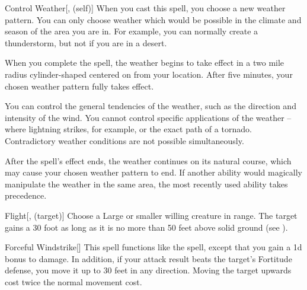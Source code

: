 \lowercase{\hypertarget{spell:Control Weather}{}}\label{spell:Control Weather}
\begin{attuneability}[\nth{4}]{\hypertarget{spell:Control Weather}{Control Weather}}[,  (self)]
When you cast this spell, you choose a new weather pattern.
You can only choose weather which would be possible in the climate and season of the area you are in.
For example, you can normally create a thunderstorm, but not if you are in a desert.

When you complete the spell, the weather begins to take effect in a two mile radius cylinder-shaped  centered on from your location.
After five minutes, your chosen weather pattern fully takes effect.

You can control the general tendencies of the weather, such as the direction and intensity of the wind.
You cannot control specific applications of the weather -- where lightning strikes, for example, or the exact path of a tornado.
Contradictory weather conditions are not possible simultaneously.

After the spell's effect ends, the weather continues on its natural course, which may cause your chosen weather pattern to end.
If another ability would magically manipulate the weather in the same area, the most recently used ability takes precedence.
\end{attuneability}
\vspace{0.25em}



\lowercase{\hypertarget{spell:Flight}{}}\label{spell:Flight}
\begin{attuneability}[\nth{4}]{\hypertarget{spell:Flight}{Flight}}[,  (target)]
Choose a Large or smaller willing creature in \rngclose range.
The target gains a 30 foot  as long as it is no more than 50 feet above solid ground (see ).
\end{attuneability}
\vspace{0.25em}



\lowercase{\hypertarget{spell:Forceful Windstrike}{}}\label{spell:Forceful Windstrike}
\begin{freeability}[\nth{4}]{\hypertarget{spell:Forceful Windstrike}{Forceful Windstrike}}[]
This spell functions like the  spell, except that you gain a \plus1d bonus to damage.
In addition, if your attack result beats the target's Fortitude defense, you move it up to 30 feet in any direction.
Moving the target upwards cost twice the normal movement cost.
\end{freeability}
\vspace{0.25em}




